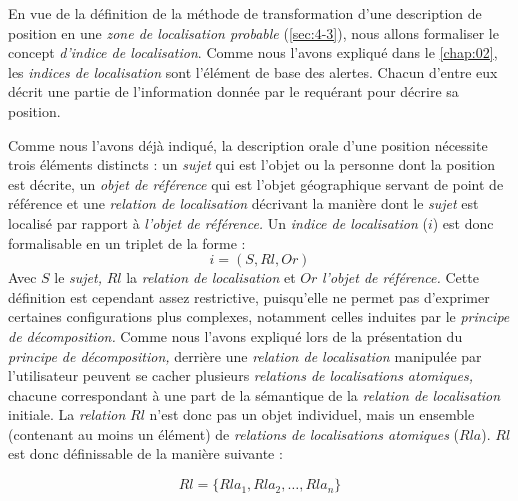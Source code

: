 En vue de la définition de la méthode de transformation d'une
description de position en une \emph{zone de localisation probable}
(\autoref{sec:4-3}), nous allons formaliser le concept \emph{d'indice
  de localisation}. Comme nous l'avons expliqué dans le
\autoref{chap:02}, les \emph{indices de localisation} sont l'élément
de base des alertes. Chacun d'entre eux décrit une partie de
l'information donnée par le requérant pour décrire sa position.

Comme nous l'avons déjà indiqué, la description orale d'une position
nécessite trois éléments distincts : un \emph{sujet} qui est l'objet
ou la personne dont la position est décrite, un \emph{objet de
  référence} qui est l'objet géographique servant de point de
référence et une \emph{relation de localisation} décrivant la manière
dont le \emph{sujet} est localisé par rapport à \emph{l'objet de
  référence.}  Un \emph{indice de localisation} (\(i\)) est donc
formalisable en un triplet de la forme :
%
\begin{equation}
  i = (S, Rl, Or)
\end{equation}
%
Avec \(S\) le \emph{sujet,} \(Rl\) la \emph{relation de localisation}
et \(Or\) \emph{l'objet de référence.} Cette définition est cependant
assez restrictive, puisqu'elle ne permet pas d'exprimer certaines
configurations plus complexes, notamment celles induites par le
\emph{principe de décomposition.} Comme nous l'avons expliqué lors de
la présentation du \emph{principe de décomposition,} derrière une
\emph{relation de localisation} manipulée par l'utilisateur peuvent se
cacher plusieurs \emph{relations de localisations atomiques,} chacune
correspondant à une part de la sémantique de la \emph{relation de
  localisation} initiale. La \emph{relation} \(Rl\) n'est donc pas un
objet individuel, mais un ensemble (contenant au moins un élément) de
\emph{relations de localisations atomiques} (\(Rla\)). \(Rl\) est donc
définissable de la manière suivante :

\begin{equation}
  Rl = \{Rla_1, Rla_2, \ldots, Rla_n\}
\end{equation}

